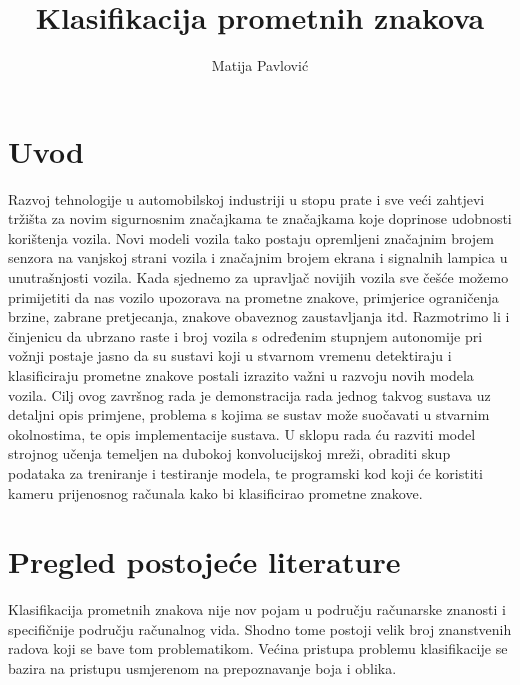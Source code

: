 \documentclass[times, utf8, zavrsni]{fer}
\begin{document}

\title{Klasifikacija prometnih znakova}

\author{Matija Pavlović}

\maketitle

\izvornik

\zahvala{}

\tableofcontents

\chapter{Uvod}
Razvoj tehnologije u automobilskoj industriji u stopu prate i sve veći zahtjevi tržišta za novim sigurnosnim značajkama te značajkama koje doprinose udobnosti korištenja vozila. Novi modeli vozila tako postaju opremljeni značajnim brojem senzora na vanjskoj strani vozila i značajnim brojem ekrana i signalnih lampica u unutrašnjosti vozila. Kada sjednemo za upravljač novijih vozila sve češće možemo primijetiti da nas vozilo upozorava na prometne znakove, primjerice ograničenja brzine, zabrane pretjecanja, znakove obaveznog zaustavljanja itd. Razmotrimo li i činjenicu da ubrzano raste i broj vozila s određenim stupnjem autonomije pri vožnji postaje jasno da su sustavi koji u stvarnom vremenu detektiraju i klasificiraju prometne znakove postali izrazito važni u razvoju novih modela vozila. Cilj ovog završnog rada je demonstracija rada jednog takvog sustava uz detaljni opis primjene, problema s kojima se sustav može suočavati u stvarnim okolnostima, te opis implementacije sustava. U sklopu rada ću razviti model strojnog učenja temeljen na dubokoj konvolucijskoj mreži, obraditi skup podataka za treniranje i testiranje modela, te programski kod koji će koristiti kameru prijenosnog računala kako bi klasificirao prometne znakove.

\chapter{Pregled postojeće literature}
Klasifikacija prometnih znakova nije nov pojam u području računarske znanosti i specifičnije području računalnog vida. Shodno tome postoji velik broj znanstvenih radova koji se bave tom problematikom.
Većina pristupa problemu klasifikacije se bazira na pristupu usmjerenom na prepoznavanje boja i oblika.\citep{6033494}
\end{document}
